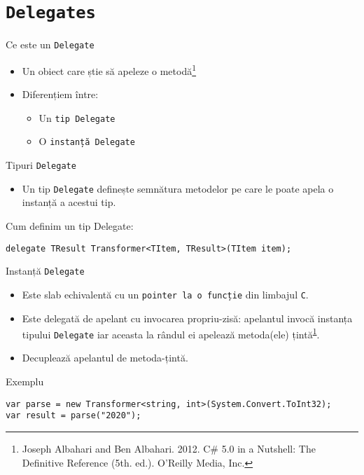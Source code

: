 \documentclass[presentation]{beamer}
\begin{document}
\section{\texttt{Delegates}}
\label{sec:orgbebd2b0}
\begin{frame}[label={sec:org2b1d8b5},fragile]{Ce este un \texttt{Delegate}}
 \begin{itemize}
\item Un obiect care știe să apeleze o metodă\footnote{Joseph Albahari and Ben Albahari. 2012. C\# 5.0 in a Nutshell: The Definitive Reference (5th. ed.). O’Reilly Media, Inc.\label{orgf882306}}
\item Diferențiem între:
\begin{itemize}
\item Un \texttt{tip Delegate}
\item O \texttt{instanță Delegate}
\end{itemize}
\end{itemize}
\end{frame}
\begin{frame}[label={sec:org09c9221},fragile]{Tipuri \texttt{Delegate}}
 \begin{itemize}
\item Un tip \texttt{Delegate} definește semnătura metodelor pe care le poate apela o instanță a acestui tip.
\end{itemize}
\begin{block}{Cum definim un tip Delegate:}
\begin{verbatim}
delegate TResult Transformer<TItem, TResult>(TItem item);
\end{verbatim}
\end{block}
\end{frame}
\begin{frame}[label={sec:org2d366d2},fragile]{Instanță \texttt{Delegate}}
 \begin{itemize}
\item Este \alert{slab echivalentă} cu un \texttt{pointer la o funcție} din limbajul \texttt{C}.
\item Este delegată de apelant cu invocarea propriu-zisă: apelantul invocă instanța tipului \texttt{Delegate} iar aceasta la rândul ei apelează metoda(ele) țintă\textsuperscript{\ref{orgf882306}}.
\item Decuplează apelantul de metoda-țintă.
\end{itemize}
\begin{block}{Exemplu}
\begin{verbatim}
var parse = new Transformer<string, int>(System.Convert.ToInt32);
var result = parse("2020");
\end{verbatim}
\end{block}
\end{frame}
\end{document}
